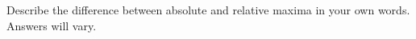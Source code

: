 {Describe the difference between absolute and relative maxima in your own words.
}
{Answers will vary.
}
